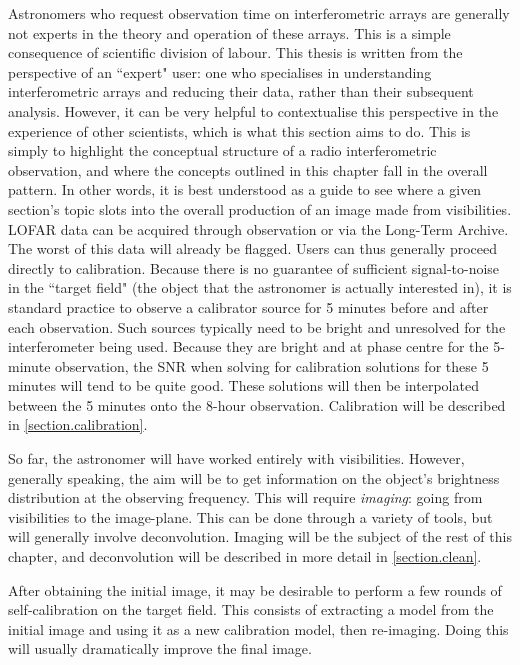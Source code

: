 \pg
Astronomers who request observation time on interferometric arrays are generally not experts in the theory and operation of these arrays. This is a simple consequence of scientific division of labour. This thesis is written from the perspective of an ``expert" user: one who specialises in understanding interferometric arrays and reducing their data, rather than their subsequent analysis. However, it can be very helpful to contextualise this perspective in the experience of other scientists, which is what this section aims to do. This is simply to highlight the conceptual structure of a radio interferometric observation, and where the concepts outlined in this chapter fall in the overall pattern. In other words, it is best understood as a guide to see where a given section's topic slots into the overall production of an image made from visibilities.
\pg
LOFAR data can be acquired through observation or via the Long-Term Archive. The worst of this data will already be flagged. Users can thus generally proceed directly to calibration. Because there is no guarantee of sufficient signal-to-noise in the ``target field" (the object that the astronomer is actually interested in), it is standard practice to observe a calibrator source for 5 minutes before and after each observation. Such sources typically need to be bright and unresolved for the interferometer being used. Because they are bright and at phase centre for the 5-minute observation, the SNR when solving for calibration solutions for these 5 minutes will tend to be quite good. These solutions will then be interpolated between the 5 minutes onto the 8-hour observation. Calibration will be described in \cref{section.calibration}.

\pg
So far, the astronomer will have worked entirely with visibilities. However, generally speaking, the aim will be to get information on the object's brightness distribution at the observing frequency. This will require \emph{imaging}: going from visibilities to the image-plane. This can be done through a variety of tools, but will generally involve deconvolution. Imaging will be the subject of the rest of this chapter, and deconvolution will be described in more detail in \cref{section.clean}.

\pg
After obtaining the initial image, it may be desirable to perform a few rounds of self-calibration  on the target field. This consists of extracting a model from the initial image and using it as a new calibration model, then re-imaging. Doing this will usually dramatically improve the final image. 

